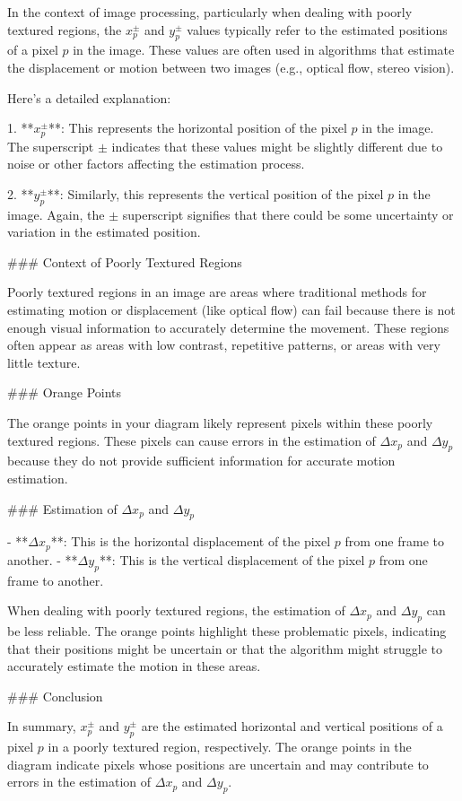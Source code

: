 In the context of image processing, particularly when dealing with poorly textured regions, the \(x_p^\pm\) and \(y_p^\pm\) values typically refer to the estimated positions of a pixel \(p\) in the image. These values are often used in algorithms that estimate the displacement or motion between two images (e.g., optical flow, stereo vision).

Here's a detailed explanation:

1. **\(x_p^\pm\)**: This represents the horizontal position of the pixel \(p\) in the image. The superscript \(\pm\) indicates that these values might be slightly different due to noise or other factors affecting the estimation process.

2. **\(y_p^\pm\)**: Similarly, this represents the vertical position of the pixel \(p\) in the image. Again, the \(\pm\) superscript signifies that there could be some uncertainty or variation in the estimated position.

### Context of Poorly Textured Regions

Poorly textured regions in an image are areas where traditional methods for estimating motion or displacement (like optical flow) can fail because there is not enough visual information to accurately determine the movement. These regions often appear as areas with low contrast, repetitive patterns, or areas with very little texture.

### Orange Points

The orange points in your diagram likely represent pixels within these poorly textured regions. These pixels can cause errors in the estimation of \(\Delta x_p\) and \(\Delta y_p\) because they do not provide sufficient information for accurate motion estimation.

### Estimation of \(\Delta x_p\) and \(\Delta y_p\)

- **\(\Delta x_p\)**: This is the horizontal displacement of the pixel \(p\) from one frame to another.
- **\(\Delta y_p\)**: This is the vertical displacement of the pixel \(p\) from one frame to another.

When dealing with poorly textured regions, the estimation of \(\Delta x_p\) and \(\Delta y_p\) can be less reliable. The orange points highlight these problematic pixels, indicating that their positions might be uncertain or that the algorithm might struggle to accurately estimate the motion in these areas.

### Conclusion

In summary, \(x_p^\pm\) and \(y_p^\pm\) are the estimated horizontal and vertical positions of a pixel \(p\) in a poorly textured region, respectively. The orange points in the diagram indicate pixels whose positions are uncertain and may contribute to errors in the estimation of \(\Delta x_p\) and \(\Delta y_p\).